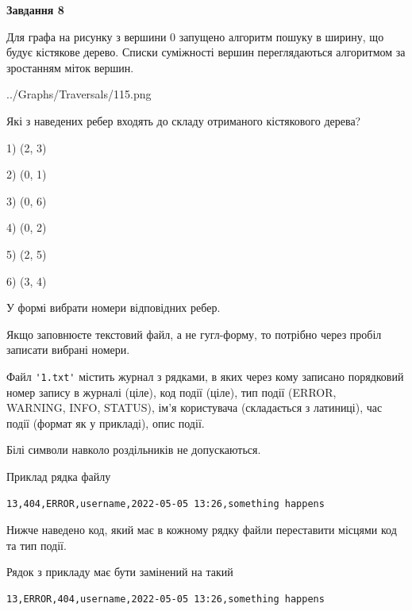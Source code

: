 \documentclass[12pt, ukrainian]{article}
\def\code#1{\Verb!#1!}
\begin{document}
{\begin {large}
{\begin {center}\textbf{Завдання 8}\end {center}}\par
Для графа на рисунку з вершини 0 запущено алгоритм пошуку в ширину, що будує кістякове дерево. Списки суміжності вершин переглядаються алгоритмом за зростанням міток вершин.\par
\begin{center}
	{../Graphs/Traversals/115.png}
\end{center}
\par Які з наведених ребер входять до складу отриманого кістякового дерева?\par
1) (2, 3)\par
2) (0, 1)\par
3) (0, 6)\par
4) (0, 2)\par
5) (2, 5)\par
6) (3, 4)\par
{\vskip 15pt} У формі вибрати номери відповідних ребер.


Якщо заповнюєте текстовий файл, а не гугл-форму, то потрібно через пробіл записа\-ти вибрані номери.\par
\newpage


Файл \code{'1.txt'} містить журнал з рядками, в яких через кому записано поряд\-ко\-вий номер запису в журналі (ціле), код події (ціле), тип події (ERROR,\\ WARNING, INFO, STATUS), ім'я користувача (складається з латиниці), час події (фор\-мат як у прикладі), опис події.

Білі символи навколо роздільників не допускаються.

Приклад рядка файлу



\begin{verbatim}
13,404,ERROR,username,2022-05-05 13:26,something happens
\end{verbatim}


Нижче наведено код, який має в кожному рядку файли переставити місцями код та тип події.

Рядок з прикладу має бути замінений на такий



\begin{verbatim}
13,ERROR,404,username,2022-05-05 13:26,something happens
\end{verbatim}





\end{large}}
\end{document}
